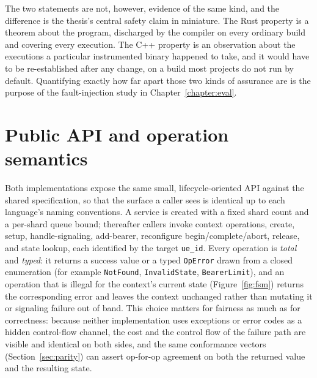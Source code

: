 \documentclass[english,twoside,openright,a4paper,censored,csm,software-track-2020]{HYthesisML}
\begin{document}
The two statements are not, however, evidence of the same kind, and the difference is the
thesis's central safety claim in miniature. The Rust property is a theorem about the program,
discharged by the compiler on every ordinary build and covering every execution. The C++
property is an observation about the executions a particular instrumented binary happened to
take, and it would have to be re-established after any change, on a build most projects do not
run by default. Quantifying exactly how far apart those two kinds of assurance are is the
purpose of the fault-injection study in Chapter~\ref{chapter:eval}.

\section{Public API and operation semantics}
Both implementations expose the same small, lifecycle-oriented API against the shared
specification, so that the surface a caller sees is identical up to each language's naming
conventions. A service is created with a fixed shard count and a per-shard queue bound;
thereafter callers invoke context operations, create, setup, handle-signaling, add-bearer,
reconfigure begin/complete/abort, release, and state lookup, each identified by the target
\texttt{ue\_id}. Every operation is \emph{total} and \emph{typed}: it returns a success value or
a typed \texttt{OpError} drawn from a closed enumeration (for example \texttt{NotFound},
\texttt{InvalidState}, \texttt{BearerLimit}), and an operation that is illegal for the context's
current state (Figure~\ref{fig:fsm}) returns the corresponding error and leaves the context
unchanged rather than mutating it or signaling failure out of band. This choice matters for
fairness as much as for correctness: because neither implementation uses exceptions or error
codes as a hidden control-flow channel, the cost and the control flow of the failure path are
visible and identical on both sides, and the same conformance vectors (Section~\ref{sec:parity})
can assert op-for-op agreement on both the returned value and the resulting state.
\end{document}
